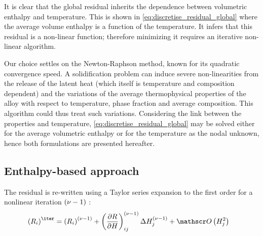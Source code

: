It is clear that the global residual inherits the dependence between volumetric enthalpy and temperature. 
This is shown in \cref{eq:discretise_residual_global} where the average volume enthalpy is a function of the temperature. It infers that this residual 
is a non-linear function; therefore minimizing it requires an iterative non-linear algorithm. 

Our choice settles on the Newton-Raphson method, known for its quadratic convergence speed. A solidification problem can induce severe non-linearities 
from the release of the latent heat (which itself is temperature and composition dependent) and the variations of the average thermophysical 
properties of the alloy with respect to temperature, phase fraction and average composition. This algorithm could thus treat such variations. 
Considering the link between the properties and temperature, \cref{eq:discretise_residual_global} may be solved either for the average volumetric enthalpy 
or for the temperature as the nodal unknown, hence both formulations are presented hereafter.


\let\iterplus\iter
\let\iter\iterminus

\subsection{Enthalpy-based approach }

The residual is re-written using a Taylor series expansion to the first order for a nonlinear iteration $\iter$ :
\begin{align}
\label{eq:Hsolver_residual}
& \brac{R_i}^\iterplus = \brac{R_i}^\iter + \brac{\dRdH}^{\iter}_{ij} \Delta \Hj^\iter + \order\brac{\Hj^2}
\end{align}

